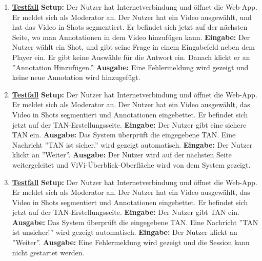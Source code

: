 \begin{enumerate}
	\item \underline{\textbf{Testfall}} \linebreak
	\textbf{Setup:} Der Nutzer hat Internetverbindung und öffnet die Web-App. Er meldet sich als Moderator an. Der Nutzer hat ein Video ausgewählt, und hat das Video in Shots segmentiert. Er befindet sich jetzt auf der nächsten Seite, wo man Annotationen in dem Video hinzufügen kann.\linebreak
	\textbf{Eingabe:} Der Nutzer wählt ein Shot, und gibt seine Frage in einem Eingabefeld neben dem Player ein. Er gibt keine Auswähle für die Antwort ein. Danach klickt er an ''Annotation Hinzufügen.''\linebreak
	\textbf{Ausgabe:} Eine Fehlermeldung wird gezeigt und keine neue Annotation wird hinzugefügt.
	
	\item \underline{\textbf{Testfall}} \linebreak
	\textbf{Setup:} Der Nutzer hat Internetverbindung und öffnet die Web-App. Er meldet sich als Moderator an. Der Nutzer hat ein Video ausgewählt, das Video in Shots segmentiert und Annotationen eingebettet. Er befindet sich jetzt auf der TAN-Erstellungsseite.\linebreak
	\textbf{Eingabe:} Der Nutzer gibt eine sichere TAN ein.\linebreak
	\textbf{Ausgabe:} Das System überprüft die eingegebene TAN. Eine Nachricht ''TAN ist sicher.'' wird gezeigt automatisch.\linebreak
	\textbf{Eingabe:} Der Nutzer klickt an ''Weiter''.\linebreak
	\textbf{Ausgabe:} Der Nutzer wird auf der nächsten Seite weitergeleitet und ViVi-Überblick-Oberfläche wird von dem System gezeigt.
	
	\item \underline{\textbf{Testfall}} \linebreak
	\textbf{Setup:} Der Nutzer hat Internetverbindung und öffnet die Web-App. Er meldet sich als Moderator an. Der Nutzer hat ein Video ausgewählt, das Video in Shots segmentiert und Annotationen eingebettet. Er befindet sich jetzt auf der TAN-Erstellungsseite.\linebreak
	\textbf{Eingabe:} Der Nutzer gibt TAN ein.\linebreak
	\textbf{Ausgabe:} Das System überprüft die eingegebene TAN. Eine Nachricht ''TAN ist unsicher!'' wird gezeigt automatisch.\linebreak
	\textbf{Eingabe:} Der Nutzer klickt an ''Weiter''.\linebreak
	\textbf{Ausgabe:} Eine Fehlermeldung wird gezeigt und die Session kann nicht gestartet werden.
	

\end{enumerate}
